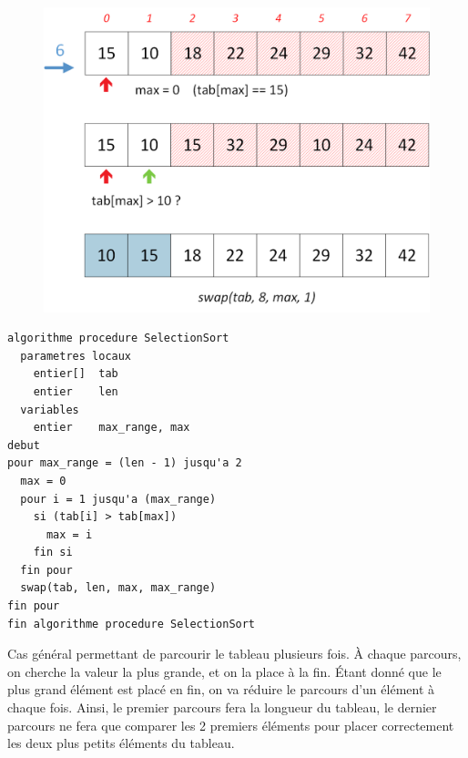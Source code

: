 \documentclass[11pt,a4paper]{article}
\begin{document}
\begin{figure}[ht!]
\centering
\centerline{
\includegraphics[scale=0.5]{img/SelectionSort_part2_2.png}
}
\end{figure}

\vfillLast

\clearpage


\begin{table}[ht!]
  \centering
\begin{lstlisting}[style=algorithmique]
algorithme procedure SelectionSort
  parametres locaux
    entier[]  tab
    entier    len
  variables
    entier    max_range, max
debut
pour max_range = (len - 1) jusqu'a 2
  max = 0
  pour i = 1 jusqu'a (max_range)
    si (tab[i] > tab[max])
      max = i
    fin si
  fin pour
  swap(tab, len, max, max_range)
fin pour
fin algorithme procedure SelectionSort \end{lstlisting}
\end{table}

Cas général permettant de parcourir le tableau plusieurs fois.
\`A chaque parcours, on cherche la valeur la plus grande, et on la place à la fin.
\'Etant donné que le plus grand élément est placé en fin, on va réduire le parcours d'un élément à chaque fois.
Ainsi, le premier parcours fera la longueur du tableau, le dernier parcours ne fera que comparer les 2 premiers éléments pour placer correctement les deux plus petits éléments du tableau.
\end{document}
